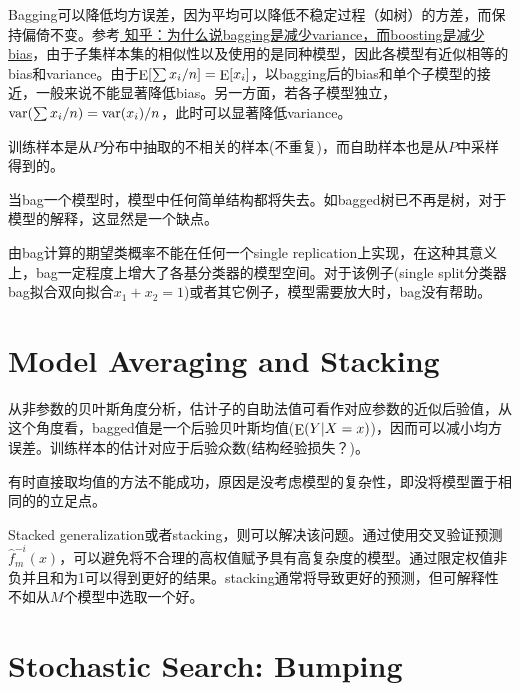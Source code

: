             Bagging可以降低均方误差，因为平均可以降低不稳定过程（如树）的方差，而保持偏倚不变。参考\href{https://www.zhihu.com/question/26760839}{\color{blue} 知乎：为什么说bagging是减少variance，而boosting是减少bias}，由于子集样本集的相似性以及使用的是同种模型，因此各模型有近似相等的bias和variance。由于${\mathop{\rm E}\nolimits} [{{\sum {{x_i}} } \mathord{\left/
 {\vphantom {{\sum {{x_i}} } n}} \right.
 \kern-\nulldelimiterspace} n}] = {\mathop{\rm E}\nolimits} [{x_i}]$，以bagging后的bias和单个子模型的接近，一般来说不能显著降低bias。另一方面，若各子模型独立，${\mathop{\rm var}} ({{\sum {{x_i}} } \mathord{\left/
 {\vphantom {{\sum {{x_i}} } n}} \right.
 \kern-\nulldelimiterspace} n}) = {{{\mathop{\rm var}} ({x_i})} \mathord{\left/
 {\vphantom {{{\mathop{\rm var}} ({x_i})} n}} \right.
 \kern-\nulldelimiterspace} n}$，此时可以显著降低variance。

            训练样本是从$P$分布中抽取的不相关的样本(不重复)，而自助样本也是从$P$中采样得到的。


            当bag一个模型时，模型中任何简单结构都将失去。如bagged树已不再是树，对于模型的解释，这显然是一个缺点。

            由bag计算的期望类概率不能在任何一个single replication上实现，在这种其意义上，bag一定程度上增大了各基分类器的模型空间。对于该例子(single split分类器bag拟合双向拟合$x_1+x_2=1$)或者其它例子，模型需要放大时，bag没有帮助。
    \section{Model Averaging and Stacking}
        从非参数的贝叶斯角度分析，估计子的自助法值可看作对应参数的近似后验值，从这个角度看，bagged值是一个后验贝叶斯均值(${\mathop{\rm E}\nolimits} (Y|X = x)$)，因而可以减小均方误差。训练样本的估计对应于后验众数(结构经验损失？)。

        有时直接取均值的方法不能成功，原因是没考虑模型的复杂性，即没将模型置于相同的的立足点。

        Stacked generalization或者stacking，则可以解决该问题。通过使用交叉验证预测$\hat f_m^{ - i}(x)$，可以避免将不合理的高权值赋予具有高复杂度的模型。通过限定权值非负并且和为1可以得到更好的结果。stacking通常将导致更好的预测，但可解释性不如从$M$个模型中选取一个好。
    \section{Stochastic Search: Bumping}




